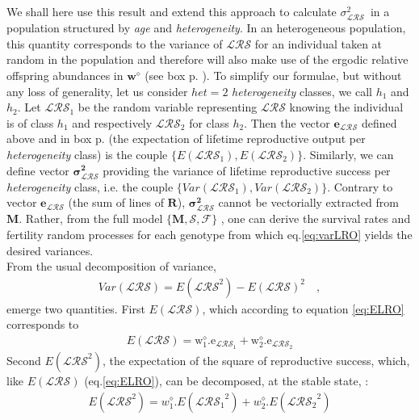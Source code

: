 \documentclass[10pt,a4paper]{article}
\newcommand{\M}{$\mathbf{M}$}
\newcommand{\vLRO}{$\sigma_{\mathrm{\mathcal{LRS}}}^2$}
\begin{document}
We shall here use this result and extend this approach to calculate \vLRO\ in a population structured by \emph{age} and \emph{heterogeneity}. %
In an heterogeneous population, this quantity corresponds to the variance of $\mathcal{LRS}$ for an individual taken at random in the population and therefore will also make use of the ergodic relative offspring abundances in $\mathbf{w}^{\diamond}$ (see box p. \pageref{box:noteonR0}).
To simplify our formulae, but without any loss of generality, let us consider $het=2$ \emph{heterogeneity} classes, we call $h_1$ and $h_2$. 
Let  $\mathcal{LRS_\mathrm{1}}$ be the random variable representing $\mathcal{LRS}$ knowing the individual is of class $h_1$ and respectively $\mathcal{LRS_\mathrm{2}}$ for class $h_2$.
Then the vector $\mathbf{e_{\mathcal{LRS}}}$ defined above and in box p.\pageref{box:noteonR0} (the expectation of lifetime reproductive output per \emph{heterogeneity} class) is the couple $\lbrace E(\mathcal{LRS}_{1}), E(\mathcal{LRS}_{2})\rbrace$. 
Similarly, we can define vector $\mathbf{\boldsymbol\sigma ^{\mathbf{2}}_{\mathcal{LRS}}}$ providing the variance of lifetime reproductive success per \emph{heterogeneity} class, i.e. the couple $\lbrace Var(\mathcal{LRS}_{1}), Var(\mathcal{LRS}_{2})\rbrace$. Contrary to vector $\mathbf{e_{\mathcal{LRS}}}$ (the sum of lines of $\mathbf{R}$), $\mathbf{\boldsymbol\sigma ^{\mathbf{2}}_{\mathcal{LRS}}}$ cannot be vectorially extracted from \M. Rather, from the full model $\lbrace \mathbf{M},\mathcal{S},\mathcal{F}\rbrace$ , one can derive the survival rates and fertility random processes for each genotype from which eq.\ref{eq:varLRO} yields the desired variances.\\

From the usual decomposition of variance, 
\begin{eqnarray}
{Var}(\mathcal{LRS})={E}(\mathcal{LRS}^2)-{E}(\mathcal{LRS})^2 \quad ,
\label{eq:dec1}
\end{eqnarray}
emerge two quantities. 
First ${E}(\mathcal{LRS})$, which according to equation \ref{eq:ELRO}  corresponds to 
\begin{eqnarray}
{E}(\mathcal{LRS})= \mathrm{w}^{\diamond}_{1}.\mathrm{e}_{\mathcal{LRS}_{1}}+\mathrm{w}^{\diamond}_{2}.\mathrm{e}_{\mathcal{LRS}_{2}}
\label{eq:cucu1}
\end{eqnarray} 
Second %
$ E(\mathcal{LRS}^2)$, the expectation of the square of reproductive success, which, like $ E(\mathcal{LRS})$ (eq.\ref{eq:ELRO}), can be decomposed, at the stable state, :
\begin{eqnarray}
E(\mathcal{LRS}^2)= w^{\diamond}_{1}.E(\mathcal{LRS_\mathrm{1}}^2) +w^{\diamond}_{2}.E(\mathcal{LRS_\mathrm{2}}^2)
\label{eq:lol}
\end{eqnarray}
\end{document}
